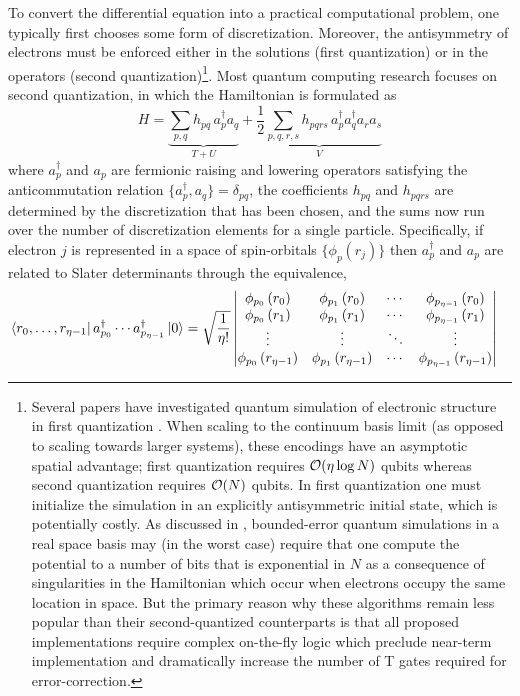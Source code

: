 \documentclass[superscriptaddress,aps,pra,nofootinbib,notitlepage,10pt,longbibliography]{revtex4-1}
\def\bra#1{\mathinner{\langle{#1}|}}
\def\ket#1{\mathinner{|{#1}\rangle}}
\begin{document}
To convert the differential equation into a practical computational problem, one typically first chooses some form of discretization.  Moreover, the antisymmetry of electrons must be enforced either in the solutions (first quantization) or in the operators (second quantization)\footnote{Several papers have investigated quantum simulation of electronic structure in first quantization \cite{Kassal2008,Toloui2013,BabbushSparse2,Kivlichan2016}. When scaling to the continuum basis limit (as opposed to scaling towards larger systems), these encodings have an asymptotic spatial advantage; first quantization requires ${\cal O}(\eta \log N)$ qubits whereas second quantization requires ${\cal O}(N)$ qubits. In first quantization one must initialize the simulation in an explicitly antisymmetric initial state, which is potentially costly. As discussed in \cite{Kivlichan2016}, bounded-error quantum simulations in a real space basis may (in the worst case) require that one compute the potential to a number of bits that is exponential in $N$ as a consequence of singularities in the Hamiltonian which occur when electrons occupy the same location in space. But the primary reason why these algorithms remain less popular than their second-quantized counterparts is that all proposed implementations \cite{Kassal2008,Toloui2013,BabbushSparse2,Kivlichan2016} require complex on-the-fly logic which preclude near-term implementation and dramatically increase the number of T gates required for error-correction.}. Most quantum computing research focuses on second quantization, in which the Hamiltonian is formulated as
\begin{equation}
\label{eq:n4}
H = \underbrace{\sum_{p, q} h_{pq} \, a^\dagger_p a_q}_{T + U} + \underbrace{\frac{1}{2} \sum_{p, q, r, s} h_{pqrs} \, a^\dagger_p a^\dagger_q a_r a_s}_{V}
\end{equation}
where $a^\dagger_p$ and $a_p$ are fermionic raising and lowering operators satisfying the anticommutation relation $\{a^\dagger_p, a_q\} = \delta_{pq}$, the coefficients $h_{pq}$ and $h_{pqrs}$ are determined by the discretization that has been chosen, and the sums now run over the number of discretization elements for a single particle. Specifically, if electron $j$ is represented in a space of spin-orbitals $\{\phi_p(r_j)\}$ then $a^\dagger_p$ and $a_p$ are related to Slater determinants through the equivalence,
\begin{align}
&  \bra{r_0,\ldots,r_{\eta-1}} a^\dagger_{p_0} \cdots a^\dagger_{p_{\eta-1}} \ket{0} = \sqrt{\frac{1}{\eta!}}
\begin{vmatrix}
\phi_{p_0}\left(r_0\right) & \phi_{p_1}\left( r_0\right) & \cdots & \phi_{p_{\eta-1}} \left( r_0\right) \\
\phi_{p_0}\left(r_1\right) & \phi_{p_1}\left( r_1\right) & \cdots & \phi_{p_{\eta-1}} \left( r_1\right) \\
\vdots & \vdots & \ddots & \vdots\\
\phi_{p_0}\left(r_{\eta-1}\right) & \phi_{p_1}\left(r_{\eta-1}\right) & \cdots & \phi_{p_{\eta-1}} \left(r_{\eta-1}\right) \end{vmatrix}
\end{align}
\end{document}
